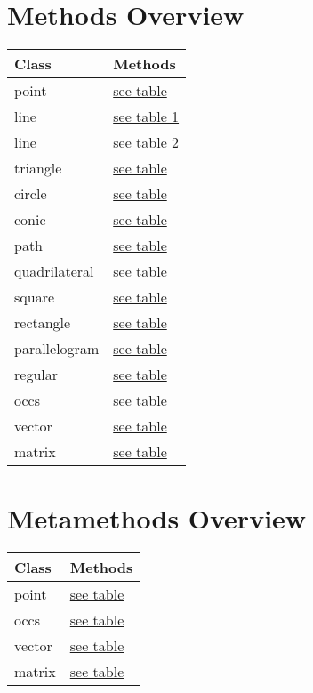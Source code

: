 \documentclass[
  DIV=14,
  fontsize=10,
  index=totoc,
  twoside,
  cadre,
  headings=small
]{tkz-doc}
\begin{document}
\section*{Methods Overview}
\begin{tabular}{ll}
\textbf{Class} & \textbf{Methods} \\
\hline
point & \hyperref[point:methods]{see table}       \\
line & \hyperref[line:methods part 1]{see table 1}         \\
line & \hyperref[line:methods part 2]{see table 2}         \\
triangle & \hyperref[triangle:methods]{see table} \\
circle & \hyperref[circle:methods]{see table}     \\
conic & \hyperref[conic:methods]{see table}       \\
path & \hyperref[path:methods]{see table}         \\
quadrilateral & \hyperref[quadrilateral:methods]{see table}\\
square & \hyperref[square:methods]{see table}     \\
rectangle & \hyperref[rectangle:methods]{see table} \\
parallelogram & \hyperref[parallelogram:methods]{see table} \\
regular & \hyperref[regular:methods]{see table}   \\
occs & \hyperref[occs:methods]{see table}         \\
vector & \hyperref[vector:methods]{see table}   \\
matrix & \hyperref[matrix:methods]{see table} \\
\end{tabular}
\section*{Metamethods Overview}
\begin{tabular}{ll}
\textbf{Class} & \textbf{Methods} \\
\hline
point & \hyperref[point:methods]{see table}       \\
occs & \hyperref[occs:methods]{see table}       \\
vector & \hyperref[vector:methods]{see table}  \\
matrix & \hyperref[matrix:methods]{see table} \\
\end{tabular}
\clearpage
\tableofcontents
\end{document}
